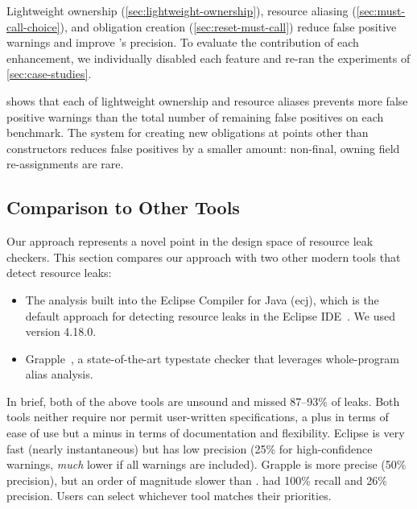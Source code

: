 Lightweight ownership (\cref{sec:lightweight-ownership}),
resource aliasing (\cref{sec:must-call-choice}), and
obligation creation (\cref{sec:reset-must-call})
reduce false positive warnings and improve \tool's precision.
To evaluate the contribution of each enhancement, we individually disabled each
feature and re-ran the experiments of \cref{sec:case-studies}.

 shows that each of lightweight
ownership and resource aliases prevents more false positive warnings than the total number
of remaining false positives on each benchmark.
The system for creating new obligations at points other than constructors reduces
false positives by a smaller amount: non-final, owning field re-assignments
are rare.


\subsection{Comparison to Other Tools}
\label{sec:compare}

Our approach represents a novel point in the design space of resource leak checkers.
%
This section compares our approach with two other modern tools that detect resource leaks:
\begin{itemize}
\item The analysis built into the Eclipse Compiler for Java (ecj), which is the default approach
  for detecting resource leaks in the Eclipse IDE~\cite{ecj-resource-leak}.
  We used version 4.18.0.
\item Grapple~\cite{zuo2019grapple}, a state-of-the-art typestate checker that
leverages whole-program alias analysis.
\end{itemize}
In brief, both of the above tools are unsound and missed 87--93\% of leaks.
Both tools neither require nor permit user-written specifications,
a plus in terms of ease of use but a minus in terms of documentation and
flexibility. Eclipse is very fast (nearly instantaneous) but has low precision
(25\% for high-confidence warnings, \emph{much} lower if all warnings are
included). Grapple is more precise (50\% precision), but
an order of
magnitude slower than \tool.  \Tool had 100\% recall and 26\%
precision.  Users can select whichever tool matches their priorities.

